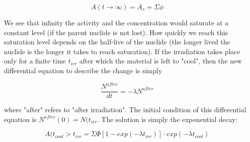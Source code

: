 \begin{equation}
A(t\rightarrow \infty)=A_s=\Sigma\phi
\end{equation}

\noindent We see that infinity the activity and the concentration would saturate at a constant level (if the parent nuclide is not lost). How quickly we reach this saturation level depends on the half-live of the nuclide (the longer lived the nuclide is the longer it takes to reach saturation). If the irradiation takes place only for a finite time $t_{irr}$ after which the material is left to "cool", then the new differential equation to describe the change is simply

\begin{equation}
\frac{N^{after}}{dt}=-\lambda N^{after}
\end{equation}

\noindent where "after" refers to "after irradiation". The initial condition of this differential equation is $N^{after}(0)=N(t_{irr}$. The solution is simply the exponential decay:

\begin{equation}
A(t_{cool}>t_{irr}=\Sigma\Phi[1-exp(-\lambda t_{irr})]\cdot exp(-\lambda t_{cool})
\end{equation}



